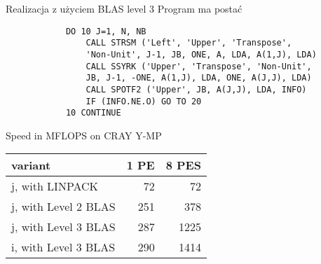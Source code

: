 	\begin{frame}[fragile]{Realizacja z użyciem BLAS level 3}
	Program ma postać
		\begin{lstlisting}
			DO 10 J=1, N, NB
				CALL STRSM ('Left', 'Upper', 'Transpose', 
				'Non-Unit', J-1, JB, ONE, A, LDA, A(1,J), LDA)
				CALL SSYRK ('Upper', 'Transpose', 'Non-Unit', 
				JB, J-1, -ONE, A(1,J), LDA, ONE, A(J,J), LDA)
				CALL SPOTF2 ('Upper', JB, A(J,J), LDA, INFO)
				IF (INFO.NE.O) GO TO 20
			10 CONTINUE
		\end{lstlisting}
	\end{frame}
	\begin{frame}{Speed in MFLOPS on CRAY Y-MP}
		\begin{center}
    			\begin{tabular}{| l | r | r |}
   				 \hline
				 variant & 1 PE & 8 PES \\
				 \hline
				 j, with LINPACK & 72 & 72 \\
				 j, with Level 2 BLAS & 251 & 378 \\
				 j, with Level 3 BLAS & 287 & 1225 \\
				 i, with Level 3 BLAS & 290 & 1414 \\
				 \hline
			\end{tabular}
		\end{center}
	\end{frame}
	

	